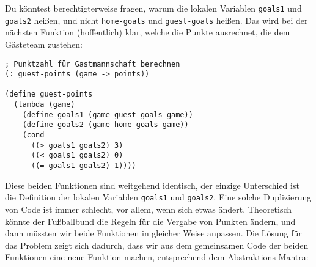 %
Du könntest berechtigterweise fragen, warum die lokalen Variablen
\lstinline{goals1} und \lstinline{goals2} heißen, und nicht
\lstinline{home-goals} und \lstinline{guest-goals} heißen.  Das wird
bei der nächsten Funktion (hoffentlich) klar, welche die Punkte
ausrechnet, die dem Gästeteam zustehen:
%
\begin{lstlisting}
; Punktzahl für Gastmannschaft berechnen
(: guest-points (game -> points))

(define guest-points
  (lambda (game)
    (define goals1 (game-guest-goals game))
    (define goals2 (game-home-goals game))
    (cond
      ((> goals1 goals2) 3)
      ((< goals1 goals2) 0)
      ((= goals1 goals2) 1))))
\end{lstlisting}
%
Diese beiden Funktionen sind weitgehend identisch, der einzige
Unterschied ist die Definition der lokalen Variablen
\lstinline{goals1} und \lstinline{goals2}. Eine solche Duplizierung
von Code ist immer schlecht, vor allem, wenn sich etwas
ändert. Theoretisch könnte der Fußballbund die Regeln für die Vergabe
von Punkten ändern, und dann müssten wir beide Funktionen in
gleicher Weise anpassen.  Die Lösung für das Problem zeigt sich
dadurch, dass wir aus dem gemeinsamen Code der beiden Funktionen
eine neue Funktion machen, entsprechend dem Abstraktions-Mantra:

\mantraabstraktion*

